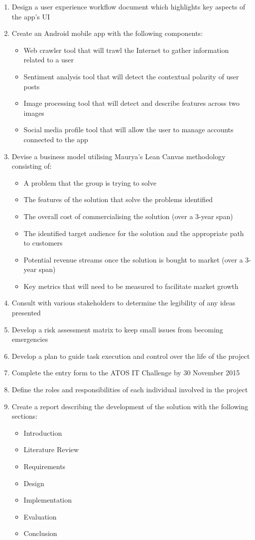 \begin{enumerate}
	\item Design a user experience workflow document which highlights key aspects of the app’s UI
	\item Create an Android mobile app with the following components:
		\begin{itemize}
			\item Web crawler tool that will trawl the Internet to gather information related to a user
			\item Sentiment analysis tool that will detect the contextual polarity of user posts
			\item Image processing tool that will detect and describe features across two images
			\item Social media profile tool that will allow the user to manage accounts connected to the app
		\end{itemize}
	\item Devise a business model utilising Maurya’s Lean Canvas methodology consisting of:
		\begin{itemize}
			\item A problem that the group is trying to solve
			\item The features of the solution that solve the problems identified 
			\item The overall cost of commercialising the solution (over a 3-year span)
			\item The identified target audience for the solution and the appropriate path to customers
			\item Potential revenue streams once the solution is bought to market (over a 3-year span)
			\item Key metrics that will need to be measured to facilitate market growth
		\end{itemize}
	\item Consult with various stakeholders to determine the legibility of any ideas presented
	\item Develop a risk assessment matrix to keep small issues from becoming emergencies
	\item Develop a plan to guide task execution and control over the life of the project
	\item Complete the entry form to the ATOS IT Challenge by 30 November 2015
	\item Define the roles and responsibilities of each individual involved in the project 
	\item Create a report describing the development of the solution with the following sections:
		\begin{itemize}
			\item Introduction
			\item Literature Review
			\item Requirements
			\item Design
			\item Implementation
			\item Evaluation
			\item Conclusion
		\end{itemize}
\end{enumerate}

